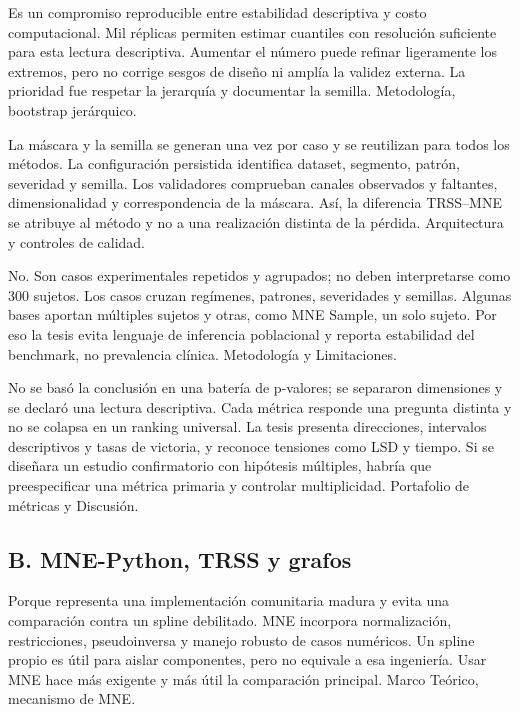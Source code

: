 {Es un compromiso reproducible entre estabilidad descriptiva y costo computacional.}
{Mil réplicas permiten estimar cuantiles con resolución suficiente para esta lectura descriptiva. Aumentar el número puede refinar ligeramente los extremos, pero no corrige sesgos de diseño ni amplía la validez externa. La prioridad fue respetar la jerarquía y documentar la semilla.}
{Metodología, bootstrap jerárquico.}

{La máscara y la semilla se generan una vez por caso y se reutilizan para todos los métodos.}
{La configuración persistida identifica dataset, segmento, patrón, severidad y semilla. Los validadores comprueban canales observados y faltantes, dimensionalidad y correspondencia de la máscara. Así, la diferencia TRSS--MNE se atribuye al método y no a una realización distinta de la pérdida.}
{Arquitectura y controles de calidad.}

{No. Son casos experimentales repetidos y agrupados; no deben interpretarse como 300 sujetos.}
{Los casos cruzan regímenes, patrones, severidades y semillas. Algunas bases aportan múltiples sujetos y otras, como MNE Sample, un solo sujeto. Por eso la tesis evita lenguaje de inferencia poblacional y reporta estabilidad del benchmark, no prevalencia clínica.}
{Metodología y Limitaciones.}

{No se basó la conclusión en una batería de p-valores; se separaron dimensiones y se declaró una lectura descriptiva.}
{Cada métrica responde una pregunta distinta y no se colapsa en un ranking universal. La tesis presenta direcciones, intervalos descriptivos y tasas de victoria, y reconoce tensiones como LSD y tiempo. Si se diseñara un estudio confirmatorio con hipótesis múltiples, habría que preespecificar una métrica primaria y controlar multiplicidad.}
{Portafolio de métricas y Discusión.}

\subsection*{B. MNE-Python, TRSS y grafos}

{Porque representa una implementación comunitaria madura y evita una comparación contra un spline debilitado.}
{MNE incorpora normalización, restricciones, pseudoinversa y manejo robusto de casos numéricos. Un spline propio es útil para aislar componentes, pero no equivale a esa ingeniería. Usar MNE hace más exigente y más útil la comparación principal.}
{Marco Teórico, mecanismo de MNE.}

